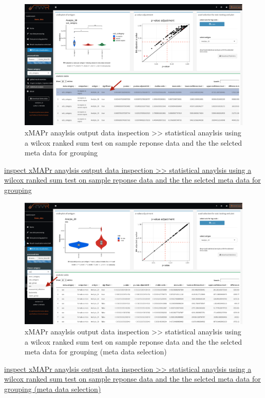 \documentclass[
]{book}
\begin{document}
\begin{figure}
\includegraphics[width=49.08in]{figures/statistical_analysis} \caption{xMAPr anaylsis output data inspection >> statistical anaylsis using a wilcox ranked sum test on sample reponse data and the the selcted meta data for grouping}\label{fig:ResponseStats}
\end{figure}

\href{figures/statistical_analysis.png}{inspect xMAPr anaylsis output data inspection \textgreater\textgreater{} statistical anaylsis using a wilcox ranked sum test on sample reponse data and the the selcted meta data for grouping}

\begin{figure}
\includegraphics[width=49.03in]{figures/statistical_analysis1} \caption{xMAPr anaylsis output data inspection >> statistical anaylsis using a wilcox ranked sum test on sample reponse data and the the selcted meta data for grouping (meta data selection)}\label{fig:ResponseStats1}
\end{figure}

\href{figures/statistical_analysis1.png}{inspect xMAPr anaylsis output data inspection \textgreater\textgreater{} statistical anaylsis using a wilcox ranked sum test on sample reponse data and the the selcted meta data for grouping (meta data selection)}
\end{document}
